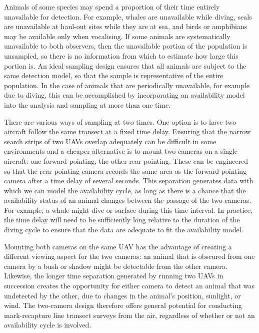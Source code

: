 \documentclass[useAMS, usenatbib, referee]{biom}\usepackage[]{graphicx}\usepackage[]{color}
\begin{document}
Animals of some species may spend a proportion of their time entirely unavailable for detection. For example, whales are unavailable while diving, seals are unavailable at haul-out sites while they are at sea, and birds or amphibians may be available only when vocalising. If some animals are systematically unavailable to both observers, then the unavailable portion of the population is unsampled, so there is no information from which to estimate how large this portion is. %
An ideal sampling design ensures that all animals are subject to the same detection model, so that the sample is representative of the entire population. In the case of animals that are periodically unavailable, for example due to diving, this can be accomplished by incorporating an availability model into the analysis and sampling at more than one time.

There are various ways of sampling at two times. One option is to have two aircraft follow the same transect at a fixed time delay. Ensuring that the narrow search strips of two UAVs overlap adequately can be difficult in some environments and a cheaper alternative is to mount two cameras on a single aircraft: one forward-pointing, the other rear-pointing. These can be engineered so that the rear-pointing camera records the same area as the forward-pointing camera after a time delay of several seconds. This separation generates data with which we can model the availability cycle, as long as there is a chance that the availability status of an animal changes between the passage of the two cameras. For example, a whale might dive or surface during this time interval. In practice, the time delay will need to be sufficiently long relative to the duration of the diving cycle to ensure that the data are adequate to fit the availability model.

Mounting both cameras on the same UAV has the advantage of creating a different viewing aspect for the two cameras: an animal that is obscured from one camera by a bush or shadow might be detectable from the other camera. Likewise, the longer time separation generated by running two UAVs in succession creates the opportunity for either camera to detect an animal that was undetected by the other, due to changes in the animal's position, sunlight, or wind. The two-camera design therefore offers general potential for conducting mark-recapture line transect surveys from the air, regardless of whether or not an availability cycle is involved.
\end{document}
